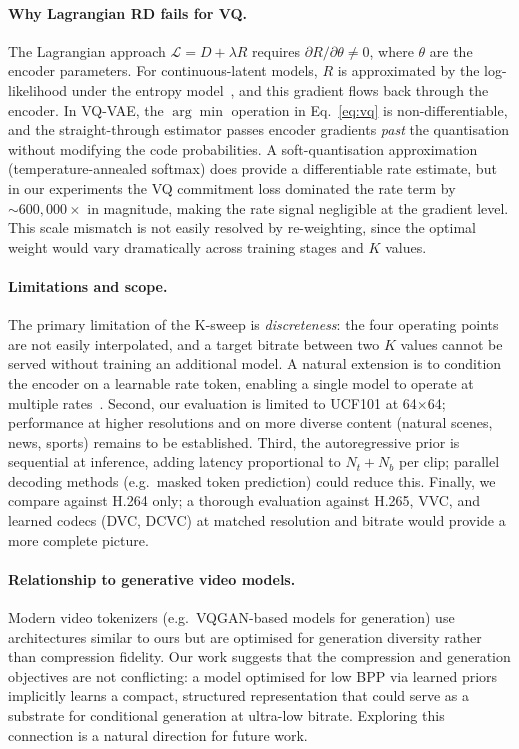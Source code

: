 \documentclass{article}
\begin{document}
\paragraph{Why Lagrangian RD fails for VQ.}
The Lagrangian approach $\mathcal{L} = D + \lambda R$ requires $\partial R /
\partial \theta \neq 0$, where $\theta$ are the encoder parameters.
For continuous-latent models, $R$ is approximated by the log-likelihood under
the entropy model~\cite{balle2018variational,minnen2018joint}, and this
gradient flows back through the encoder.
In VQ-VAE, the $\arg\min$ operation in Eq.~\ref{eq:vq} is non-differentiable,
and the straight-through estimator passes encoder gradients \emph{past} the
quantisation without modifying the code probabilities.
A soft-quantisation approximation (temperature-annealed softmax) does
provide a differentiable rate estimate, but in our experiments the VQ
commitment loss dominated the rate term by $\sim\!600{,}000\times$ in
magnitude, making the rate signal negligible at the gradient level.
This scale mismatch is not easily resolved by re-weighting, since the optimal
weight would vary dramatically across training stages and $K$ values.

\paragraph{Limitations and scope.}
The primary limitation of the K-sweep is \emph{discreteness}: the four
operating points are not easily interpolated, and a target bitrate between
two $K$ values cannot be served without training an additional model.
A natural extension is to condition the encoder on a learnable rate token,
enabling a single model to operate at multiple rates~\cite{mentzer2022vqcompression}.
Second, our evaluation is limited to UCF101 at 64$\times$64;
performance at higher resolutions and on more diverse content (natural
scenes, news, sports) remains to be established.
Third, the autoregressive prior is sequential at inference, adding latency
proportional to $N_t + N_b$ per clip; parallel decoding methods (e.g.\
masked token prediction) could reduce this.
Finally, we compare against H.264 only; a thorough evaluation against H.265,
VVC, and learned codecs (DVC, DCVC) at matched resolution and bitrate would
provide a more complete picture.

\paragraph{Relationship to generative video models.}
Modern video tokenizers (e.g.\ VQGAN-based models for generation) use
architectures similar to ours but are optimised for generation diversity
rather than compression fidelity.
Our work suggests that the compression and generation objectives are not
conflicting: a model optimised for low BPP via learned priors implicitly
learns a compact, structured representation that could serve as a substrate
for conditional generation at ultra-low bitrate.
Exploring this connection is a natural direction for future work.
\end{document}
